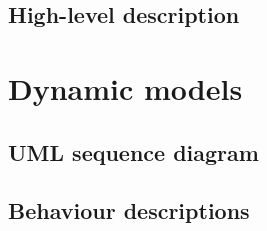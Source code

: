 \documentclass[titlepage, 12pt]{extarticle}
\begin{document}
\subsection{High-level description}

\section{Dynamic models}
\subsection{UML sequence diagram}
\subsection{Behaviour descriptions}
\end{document}
